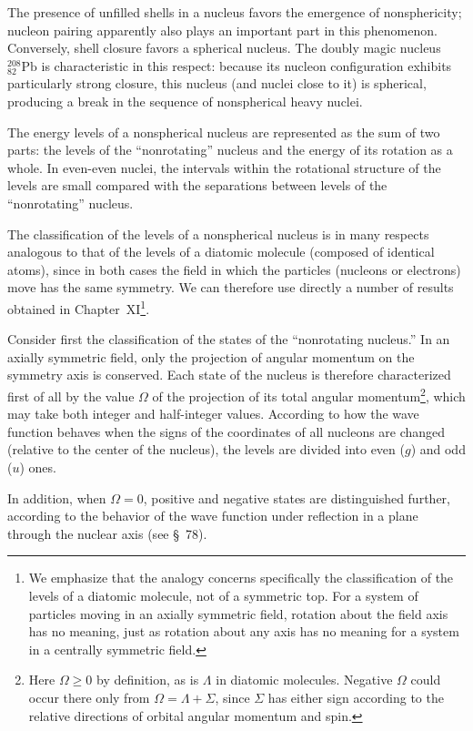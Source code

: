 The presence of unfilled shells in a nucleus favors the emergence of nonsphericity; nucleon pairing apparently also plays an important part in this phenomenon. Conversely, shell closure favors a spherical nucleus. The doubly magic nucleus ${}^{208}_{82}\mathrm{Pb}$ is characteristic in this respect: because its nucleon configuration exhibits particularly strong closure, this nucleus (and nuclei close to it) is spherical, producing a break in the sequence of nonspherical heavy nuclei.

The energy levels of a nonspherical nucleus are represented as the sum of two parts: the levels of the ``nonrotating'' nucleus and the energy of its rotation as a whole. In even-even nuclei, the intervals within the rotational structure of the levels are small compared with the separations between levels of the ``nonrotating'' nucleus.

The classification of the levels of a nonspherical nucleus is in many respects analogous to that of the levels of a diatomic molecule (composed of identical atoms), since in both cases the field in which the particles (nucleons or electrons) move has the same symmetry. We can therefore use directly a number of results obtained in Chapter~XI\footnote{We emphasize that the analogy concerns specifically the classification of the levels of a diatomic molecule, not of a symmetric top. For a system of particles moving in an axially symmetric field, rotation about the field axis has no meaning, just as rotation about any axis has no meaning for a system in a centrally symmetric field.}.

Consider first the classification of the states of the ``nonrotating nucleus.'' In an axially symmetric field, only the projection of angular momentum on the symmetry axis is conserved. Each state of the nucleus is therefore characterized first of all by the value $\Omega$ of the projection of its total angular momentum\footnote{Here $\Omega\geqslant0$ by definition, as is $\Lambda$ in diatomic molecules. Negative $\Omega$ could occur there only from $\Omega=\Lambda+\Sigma$, since $\Sigma$ has either sign according to the relative directions of orbital angular momentum and spin.}, which may take both integer and half-integer values. According to how the wave function behaves when the signs of the coordinates of all nucleons are changed (relative to the center of the nucleus), the levels are divided into even ($g$) and odd ($u$) ones.

In addition, when $\Omega=0$, positive and negative states are distinguished further, according to the behavior of the wave function under reflection in a plane through the nuclear axis (see \S~78).

